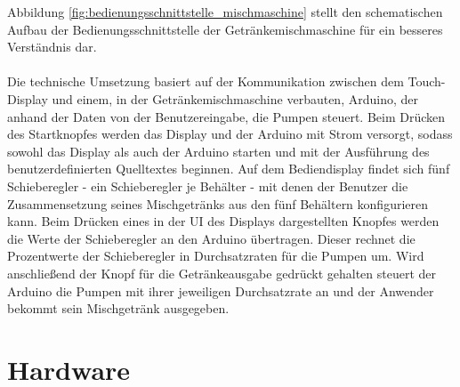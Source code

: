 \noindent
Abbildung \ref{fig:bedienungsschnittstelle_mischmaschine} stellt den schematischen Aufbau der Bedienungsschnittstelle der Getränkemischmaschine für ein besseres Verständnis dar.\\\\
Die technische Umsetzung basiert auf der Kommunikation zwischen dem Touch-Display und einem, in der Getränkemischmaschine verbauten, Arduino, der anhand der Daten von der Benutzereingabe, die Pumpen steuert. Beim Drücken des Startknopfes werden das Display und der Arduino mit Strom versorgt, sodass sowohl das Display als auch der Arduino starten und mit der Ausführung des benutzerdefinierten Quelltextes beginnen. Auf dem Bediendisplay findet sich fünf Schieberegler - ein Schieberegler je Behälter - mit denen der Benutzer die Zusammensetzung seines Mischgetränks aus den fünf Behältern konfigurieren kann. Beim Drücken eines in der \ac{UI} des Displays dargestellten Knopfes werden die Werte der Schieberegler an den Arduino übertragen. Dieser rechnet die Prozentwerte der Schieberegler in Durchsatzraten für die Pumpen um. Wird anschließend der Knopf für die Getränkeausgabe gedrückt gehalten steuert der Arduino die Pumpen mit ihrer jeweiligen Durchsatzrate an und der Anwender bekommt sein Mischgetränk ausgegeben.
\section{Hardware}

